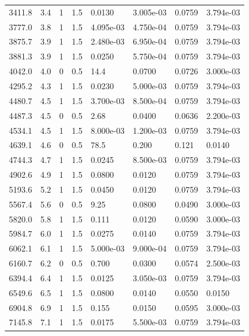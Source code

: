 \documentclass[preview]{standalone}
\begin{document}
{{\begin{tabular}{L{1.2cm}C{1.2cm} C{0.3cm}C{0.5cm} C{1.4cm}C{1.4cm} C{1.4cm}C{1.4cm}}
  3411.8  &   3.4  & 1     & 1.5 &  0.0130  & 3.005e-03  & 0.0759 &  3.794e-03   \\ 
  3777.0  &   3.8  & 1     & 1.5 &  4.095e-03  & 4.750e-04  & 0.0759 &  3.794e-03   \\ 
  3875.7  &   3.9  & 1     & 1.5 &  2.480e-03  & 6.950e-04  & 0.0759 &  3.794e-03   \\ 
  3881.3  &   3.9  & 1     & 1.5 &  0.0250  & 5.750e-04  & 0.0759 &  3.794e-03   \\ 
  4042.0  &   4.0  & 0     & 0.5 &  14.4  & 0.0700  & 0.0726 &  3.000e-03   \\ 
  4295.2  &   4.3  & 1     & 1.5 &  0.0230  & 5.000e-03  & 0.0759 &  3.794e-03   \\ 
  4480.7  &   4.5  & 1     & 1.5 &  3.700e-03  & 8.500e-04  & 0.0759 &  3.794e-03   \\ 
  4487.3  &   4.5  & 0     & 0.5 &  2.68  & 0.0400  & 0.0636 &  2.200e-03   \\ 
  4534.1  &   4.5  & 1     & 1.5 &  8.000e-03  & 1.200e-03  & 0.0759 &  3.794e-03   \\ 
  4639.1  &   4.6  & 0     & 0.5 &  78.5  & 0.200  & 0.121 &  0.0140   \\ 
  4744.3  &   4.7  & 1     & 1.5 &  0.0245  & 8.500e-03  & 0.0759 &  3.794e-03   \\ 
  4902.6  &   4.9  & 1     & 1.5 &  0.0800  & 0.0120  & 0.0759 &  3.794e-03   \\ 
  5193.6  &   5.2  & 1     & 1.5 &  0.0450  & 0.0120  & 0.0759 &  3.794e-03   \\ 
  5567.4  &   5.6  & 0     & 0.5 &  9.25  & 0.0800  & 0.0490 &  3.000e-03   \\ 
  5820.0  &   5.8  & 1     & 1.5 &  0.111  & 0.0120  & 0.0590 &  3.000e-03   \\ 
  5984.7  &   6.0  & 1     & 1.5 &  0.0275  & 0.0140  & 0.0759 &  3.794e-03   \\ 
  6062.1  &   6.1  & 1     & 1.5 &  5.000e-03  & 9.000e-04  & 0.0759 &  3.794e-03   \\ 
  6160.7  &   6.2  & 0     & 0.5 &  0.700  & 0.0300  & 0.0574 &  2.500e-03   \\ 
  6394.4  &   6.4  & 1     & 1.5 &  0.0125  & 3.050e-03  & 0.0759 &  3.794e-03   \\ 
  6549.6  &   6.5  & 1     & 1.5 &  0.0800  & 0.0140  & 0.0550 &  0.0150   \\ 
  6904.8  &   6.9  & 1     & 1.5 &  0.155  & 0.0150  & 0.0595 &  3.000e-03   \\ 
  7145.8  &   7.1  & 1     & 1.5 &  0.0175  & 5.500e-03  & 0.0759 &  3.794e-03   \\ 

\end{tabular}}}
\end{document}
